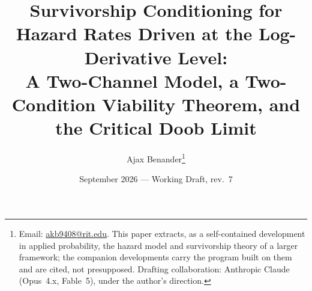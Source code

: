 \title{Survivorship Conditioning for Hazard Rates Driven at the
Log-Derivative Level:\\ \large A Two-Channel Model, a Two-Condition
Viability Theorem, and the Critical Doob Limit}
\author{Ajax Benander\thanks{Email:
\href{mailto:akb9408@rit.edu}{akb9408@rit.edu}. This paper extracts, as
a self-contained development in applied probability, the hazard model
and survivorship theory of a larger framework; the companion
developments carry the program built on them and are cited, not
presupposed. Drafting collaboration: Anthropic Claude (Opus~4.x,
Fable~5), under the author's direction.}}
\date{September 2026 --- Working Draft, rev.~7}


\maketitle

